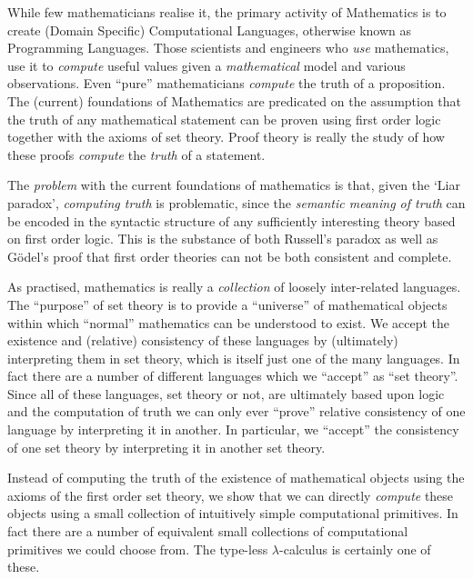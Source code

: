 
While few mathematicians realise it, the primary activity of Mathematics is to
create (Domain Specific) Computational Languages, otherwise known as Programming
Languages. Those scientists and engineers who \emph{use} mathematics, use it to
\emph{compute} useful values given a \emph{mathematical} model and
various observations. Even ``pure'' mathematicians \emph{compute} the truth of a
proposition. The (current) foundations of Mathematics are predicated on the
assumption that the truth of any mathematical statement can be proven using
first order logic together with the axioms of set theory. Proof theory is really
the study of how these proofs \emph{compute} the \emph{truth} of a statement.

The \emph{problem} with the current foundations of mathematics is that, given
the `Liar paradox', \emph{computing truth} is problematic, since the
\emph{semantic meaning of truth} can be encoded in the syntactic structure of
any sufficiently interesting theory based on first order logic. This is the
substance of both Russell's paradox as well as G\"odel's proof that first order
theories can not be both consistent and complete.

As practised, mathematics is really a \emph{collection} of loosely inter-related
languages. The ``purpose'' of set theory is to provide a ``universe'' of
mathematical objects within which ``normal'' mathematics can be understood to
exist. We accept the existence and (relative) consistency of these languages by
(ultimately) interpreting them in set theory, which is itself just one of the
many languages. In fact there are a number of different languages which we
``accept'' as ``set theory''. Since all of these languages, set theory or not,
are ultimately based upon logic and the computation of truth we can only ever
``prove'' relative consistency of one language by interpreting it in another. In
particular, we ``accept'' the consistency of one set theory by interpreting it
in another set theory.

Instead of computing the truth of the existence of mathematical objects using
the axioms of the first order set theory, we show that we can directly
\emph{compute} these objects using a small collection of intuitively simple
computational primitives. In fact there are a number of equivalent small
collections of computational primitives we could choose from. The type-less
$\lambda$-calculus is certainly one of these.

